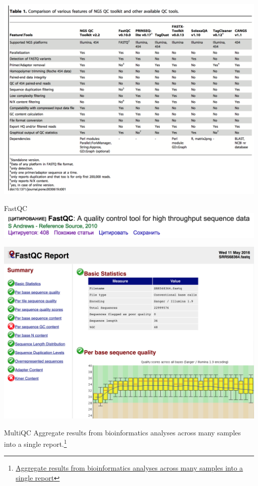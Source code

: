 \documentclass{beamer}
\begin{document}
\begin{frame}
\includegraphics[width=\linewidth]{readsqc.png}
\end{frame}

\begin{frame}{FastQC}
\includegraphics[width=\linewidth]{fastqc.png}
\end{frame}

\begin{frame}
\includegraphics[width=\linewidth]{fastqcrep.png}
\end{frame}

\begin{frame}{MultiQC}
Aggregate results from bioinformatics analyses across many samples into a single report.\footnote{\url{Aggregate results from bioinformatics analyses across many samples into a single report}}
\end{frame}
\end{document}
